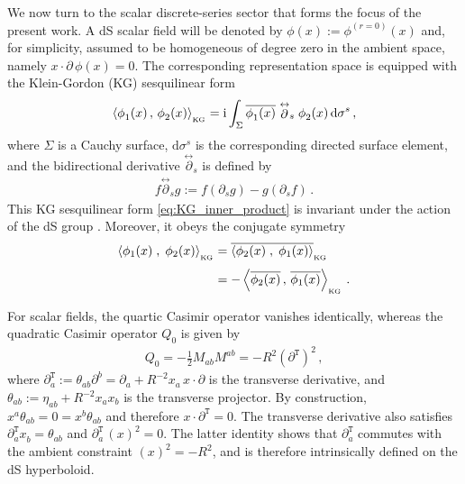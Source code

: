 \documentclass[aps,twocolumn,nofootinbib]{revtex4}
\begin{document}
We now turn to the scalar discrete-series sector that forms the focus of the present work. A dS scalar field will be denoted by $\phi(x):=\phi^{(r=0)}(x)$ and, for simplicity, assumed to be homogeneous of degree zero in the ambient space, namely $x\cdot\partial\, \phi(x) = 0$. The corresponding representation space is equipped with the Klein-Gordon (KG) sesquilinear form
\begin{align} \label{eq:KG_inner_product}
    \left\langle \phi^{}_1(x) \,,\, \phi^{}_2(x) \right\rangle_{\vphantom{}_{\text{KG}}} = \mathrm{i}\int_{\Sigma} \overline{\phi^{}_1(x)} \stackrel{\leftrightarrow}{\partial}_{s} \phi^{}_2(x)\, \mathrm{d}\sigma^s \,,
\end{align}
where $\Sigma$ is a Cauchy surface, $\mathrm{d}\sigma^s$ is the corresponding directed surface element, and the bidirectional derivative $\stackrel{\leftrightarrow}{\partial}_{s}$ is defined by
\begin{align}\label{miriam2}
    f\stackrel{\leftrightarrow}{\partial}_{s}g := f(\partial_s g) - g(\partial_s f) \,.
\end{align} 
This KG sesquilinear form \eqref{eq:KG_inner_product} is invariant under the action of the dS group \cite{Birrell-1982}. Moreover, it obeys the conjugate symmetry 
\begin{align}\label{miriamCNK}
    \left\langle \phi_1(x) \;,\; \phi_2(x) \right\rangle_{\vphantom{}_{\text{KG}}} &= \overline{\left\langle \phi_2(x) \;,\;\phi_1(x) \right\rangle}_{\vphantom{}_{\text{KG}}} \nonumber\\[3pt]
    &= -\left\langle \overline{\phi_2(x)}\,,\,\overline{\phi_1(x)}\right\rangle_{\vphantom{}_{\text{KG}}} \,.
\end{align}

For scalar fields, the quartic Casimir operator vanishes identically, whereas the quadratic Casimir operator $Q_0$ is given by \cite{Gazeau2022}
\begin{align}\label{Q_0}
    Q_0 = -\frac{1}{2}M^{}_{ab}M^{ab}
    = -R^2 ({\partial}^{\texttt{T}})^2 \,,
\end{align}
where ${\partial}^{\texttt{T}}_a := \theta_{ab}\partial^b = \partial_a + R^{-2}x_a\,x\cdot\partial$ is the transverse derivative, and $\theta_{ab} := \eta_{ab} + R^{-2} x_a x_b$ is the transverse projector. By construction, $x^a\theta_{ab}=0=x^b\theta_{ab}$ and therefore $x\cdot{\partial}^{\texttt{T}}=0$. The transverse derivative also satisfies ${\partial}^{\texttt{T}}_a x^{}_b = \theta^{}_{ab}$ and ${\partial}^{\texttt{T}}_a \,(x)^2 = 0$. The latter identity shows that ${\partial}^{\texttt{T}}_a$ commutes with the ambient constraint $(x)^2=-R^2$, and is therefore intrinsically defined on the dS hyperboloid.
\end{document}

